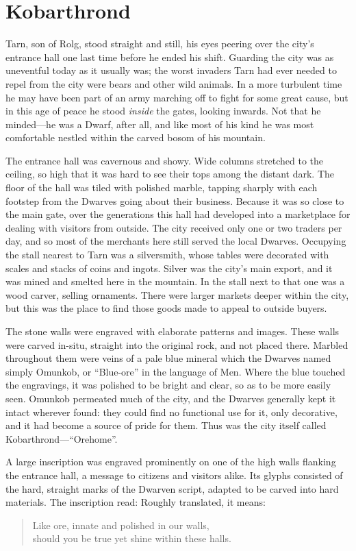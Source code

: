 \chapter{Kobarthrond}
Tarn, son of Rolg, stood straight and still, his eyes peering over the city's entrance hall one last time before he ended his shift.  Guarding the city was as uneventful today as it usually was; the worst invaders Tarn had ever needed to repel from the city were bears and other wild animals.  In a more turbulent time he may have been part of an army marching off to fight for some great cause, but in this age of peace he stood \emph{inside} the gates, looking inwards.  Not that he minded---he was a Dwarf, after all, and like most of his kind he was most comfortable nestled within the carved bosom of his mountain.

The entrance hall was cavernous and showy.  Wide columns stretched to the ceiling, so high that it was hard to see their tops among the distant dark.  The floor of the hall was tiled with polished marble, tapping sharply with each footstep from the Dwarves going about their business.  Because it was so close to the main gate, over the generations this hall had developed into a marketplace for dealing with visitors from outside.  The city received only one or two traders per day, and so most of the merchants here still served the local Dwarves.  Occupying the stall nearest to Tarn was a silversmith, whose tables were decorated with scales and stacks of coins and ingots.  Silver was the city's main export, and it was mined and smelted here in the mountain.  In the stall next to that one was a wood carver, selling ornaments.  There were larger markets deeper within the city, but this was the place to find those goods made to appeal to outside buyers.

The stone walls were engraved with elaborate patterns and images.  These walls were carved in-situ, straight into the original rock, and not placed there.  Marbled throughout them were veins of a pale blue mineral which the Dwarves named simply Omunkob, or ``Blue-ore'' in the language of Men.  Where the blue touched the engravings, it was polished to be bright and clear, so as to be more easily seen.  Omunkob permeated much of the city, and the Dwarves generally kept it intact wherever found: they could find no functional use for it, only decorative, and it had become a source of pride for them.  Thus was the city itself called Kobarthrond---``Orehome''.

A large inscription was engraved prominently on one of the high walls flanking the entrance hall, a message to citizens and visitors alike.  Its glyphs consisted of the hard, straight marks of the Dwarven script, adapted to be carved into hard materials.  The inscription read:
Roughly translated, it means:
\begin{verse}
Like ore, innate and polished in our walls,\\
should you be true yet shine within these halls.
\end{verse}

